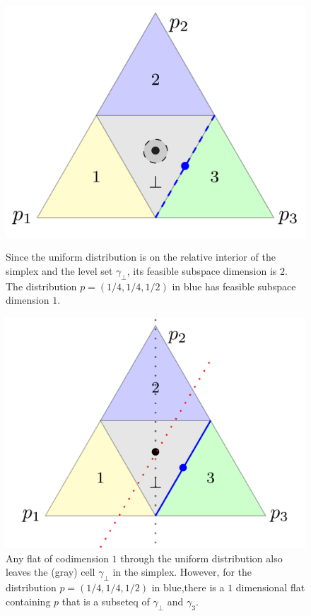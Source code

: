 \documentclass{article}
\begin{document}
\begin{figure}
\begin{minipage}{0.45\linewidth}
	\centering
	\includegraphics[width=\linewidth]{tikz/fsd-bound.pdf}
	\caption{Since the uniform distribution is on the relative interior of the simplex and the level set $\gamma_\bot$, its feasible subspace dimension is $2$. The distribution $p = (1/4, 1/4, 1/2)$ in blue has feasible subspace dimension $1$.}
	\label{fig:fsd-bound}
\end{minipage}
\hfill
\begin{minipage}{0.45\linewidth}
	\centering
	\includegraphics[width=\linewidth]{tikz/flats-bound.pdf}
	\caption{Any flat of codimension $1$ through the uniform distribution also leaves the (gray) cell $\gamma_\bot$ in the simplex. However, for the distribution $p = (1/4, 1/4, 1/2)$ in blue,there is a $1$ dimensional flat containing $p$ that is a subseteq of $\gamma_\bot$ and $\gamma_3$.}
	\label{fig:flats-bound}
\end{minipage}
\end{figure}
\end{document}
